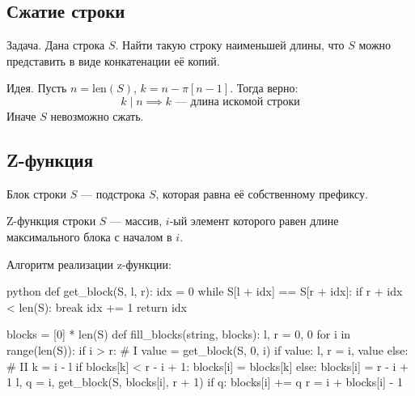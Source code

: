 \subsection{Сжатие строки}

\begin{theorem}
{\bold Задача.} Дана строка $S$. Найти такую строку наименьшей длины, что $S$ можно представить в виде конкатенации её копий.
\end{theorem}

{\bold Идея.} Пусть $n=\text{len}(S)$, $k=n-\pi[n-1]$. Тогда верно:
$$k\mid n\implies k\text{ --- длина искомой строки}$$
Иначе $S$ {\ital невозможно} сжать.

\subsection{Z-функция}

{\bold Блок} строки $S$ --- подстрока $S$, которая равна её собственному префиксу.

{\bold Z-функция} строки $S$ --- массив, $i$-ый элемент которого равен длине максимального блока с началом в $i$.

{\bold Алгоритм} реализации {\ital z-функции}:

\begin{code}{python}
def get_block(S, l, r):
  idx = 0
  while S[l + idx] == S[r + idx]:
    if r + idx < len(S):
      break
    idx += 1
  return idx

blocks = [0] * len(S)
def fill_blocks(string, blocks):
  l, r = 0, 0
  for i in range(len(S)):
    if i > r: # I
      value = get_block(S, 0, i)
      if value:
        l, r = i, value
    else: # II
      k = i - l
      if blocks[k] < r - i + 1:
        blocks[i] = blocks[k]
      else:
        blocks[i] = r - i + 1
        l, q = i, get_block(S, blocks[i], r + 1)
        if q:
          blocks[i] += q
          r = i + blocks[i] - 1
\end{code}

